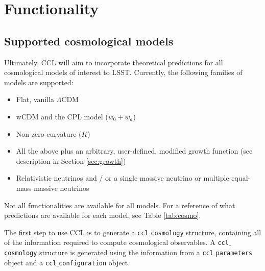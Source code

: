 \documentclass[\docopts]{\docclass}
\begin{document}
\section{Functionality}
\label{sec:func}

\subsection{Supported cosmological models}


\label{sec:cosmologies}
Ultimately, CCL will aim to incorporate theoretical predictions for all cosmological models of interest to LSST. Currently, the following families of models are supported:
\begin{itemize}
 \item Flat, vanilla $\Lambda$CDM 
 \item wCDM and the CPL model ($w_0+w_a$)
 \item Non-zero curvature ($K$)
 \item All the above plus an arbitrary, user-defined, modified growth function (see description in Section \ref{sec:growth})
  \item Relativistic neutrinos and / or a single massive neutrino or multiple equal-mass massive neutrinos
\end{itemize}

Not all functionalities are available for all models. For a reference of what predictions are available for each model, see Table \ref{tab:cosmo}.

The first step to use CCL is to generate a {\tt ccl$\_$cosmology} structure, containing all of the information required to compute cosmological observables. A {\tt ccl$\_$cosmology} structure is generated using the information from a {\tt ccl$\_$parameters} object and a {\tt ccl$\_$configuration} object.


\end{document}
